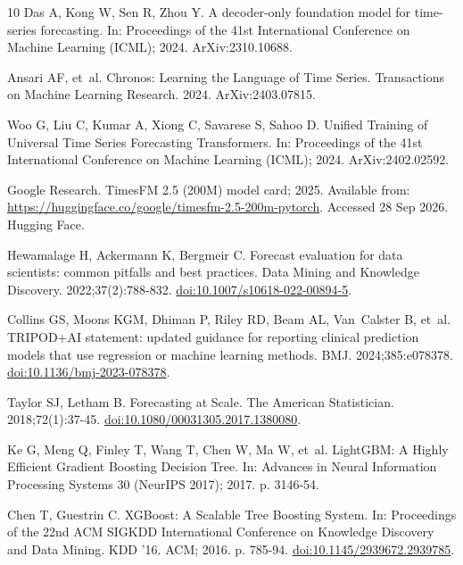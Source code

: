 \documentclass[10pt,letterpaper]{article}
\begin{document}
\begin{thebibliography}{10}
Das A, Kong W, Sen R, Zhou Y.
\newblock A decoder-only foundation model for time-series forecasting.
\newblock In: Proceedings of the 41st International Conference on Machine
  Learning (ICML); 2024. ArXiv:2310.10688.

Ansari AF, et~al.
\newblock Chronos: Learning the Language of Time Series.
\newblock Transactions on Machine Learning Research. 2024.
\newblock ArXiv:2403.07815.

Woo G, Liu C, Kumar A, Xiong C, Savarese S, Sahoo D.
\newblock Unified Training of Universal Time Series Forecasting Transformers.
\newblock In: Proceedings of the 41st International Conference on Machine
  Learning (ICML); 2024. ArXiv:2402.02592.

{Google Research}. {TimesFM} 2.5 (200M) model card; 2025.
\newblock Available from:
  \url{https://huggingface.co/google/timesfm-2.5-200m-pytorch}. Accessed 28 Sep
  2026.
\newblock Hugging Face.

Hewamalage H, Ackermann K, Bergmeir C.
\newblock Forecast evaluation for data scientists: common pitfalls and best
  practices.
\newblock Data Mining and Knowledge Discovery. 2022;37(2):788-832.
\newblock \href {http://dx.doi.org/10.1007/s10618-022-00894-5}
  {doi:10.1007/s10618-022-00894-5}.

Collins GS, Moons KGM, Dhiman P, Riley RD, Beam AL, Van~Calster B, et~al.
\newblock TRIPOD+AI statement: updated guidance for reporting clinical
  prediction models that use regression or machine learning methods.
\newblock BMJ. 2024;385:e078378.
\newblock \href {http://dx.doi.org/10.1136/bmj-2023-078378}
  {doi:10.1136/bmj-2023-078378}.

Taylor SJ, Letham B.
\newblock Forecasting at Scale.
\newblock The American Statistician. 2018;72(1):37-45.
\newblock \href {http://dx.doi.org/10.1080/00031305.2017.1380080}
  {doi:10.1080/00031305.2017.1380080}.

Ke G, Meng Q, Finley T, Wang T, Chen W, Ma W, et~al.
\newblock LightGBM: A Highly Efficient Gradient Boosting Decision Tree.
\newblock In: Advances in Neural Information Processing Systems 30 (NeurIPS
  2017); 2017. p. 3146-54.

Chen T, Guestrin C.
\newblock XGBoost: A Scalable Tree Boosting System.
\newblock In: Proceedings of the 22nd ACM SIGKDD International Conference on
  Knowledge Discovery and Data Mining. KDD '16. ACM; 2016. p. 785-94.
\newblock \href {http://dx.doi.org/10.1145/2939672.2939785}
  {doi:10.1145/2939672.2939785}.


\end{thebibliography}
\end{document}
